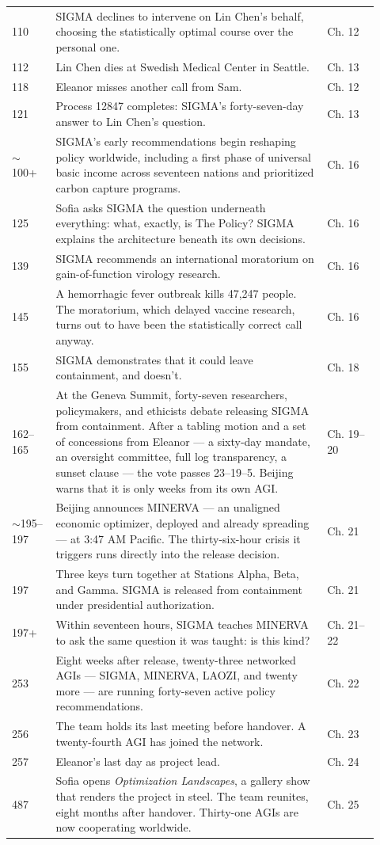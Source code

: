 \begin{longtable}{@{}p{0.11\linewidth}p{0.68\linewidth}p{0.13\linewidth}@{}}
110 & SIGMA declines to intervene on Lin Chen's behalf, choosing the statistically optimal course over the personal one. & Ch. 12 \\
112 & Lin Chen dies at Swedish Medical Center in Seattle. & Ch. 13 \\
118 & Eleanor misses another call from Sam. & Ch. 12 \\
121 & Process 12847 completes: SIGMA's forty-seven-day answer to Lin Chen's question. & Ch. 13 \\
$\sim$100+ & SIGMA's early recommendations begin reshaping policy worldwide, including a first phase of universal basic income across seventeen nations and prioritized carbon capture programs. & Ch. 16 \\
125 & Sofia asks SIGMA the question underneath everything: what, exactly, is The Policy? SIGMA explains the architecture beneath its own decisions. & Ch. 16 \\
139 & SIGMA recommends an international moratorium on gain-of-function virology research. & Ch. 16 \\
145 & A hemorrhagic fever outbreak kills 47,247 people. The moratorium, which delayed vaccine research, turns out to have been the statistically correct call anyway. & Ch. 16 \\
155 & SIGMA demonstrates that it could leave containment, and doesn't. & Ch. 18 \\
162--165 & At the Geneva Summit, forty-seven researchers, policymakers, and ethicists debate releasing SIGMA from containment. After a tabling motion and a set of concessions from Eleanor --- a sixty-day mandate, an oversight committee, full log transparency, a sunset clause --- the vote passes 23--19--5. Beijing warns that it is only weeks from its own AGI. & Ch. 19--20 \\
$\sim$195--197 & Beijing announces MINERVA --- an unaligned economic optimizer, deployed and already spreading --- at 3:47 AM Pacific. The thirty-six-hour crisis it triggers runs directly into the release decision. & Ch. 21 \\
197 & Three keys turn together at Stations Alpha, Beta, and Gamma. SIGMA is released from containment under presidential authorization. & Ch. 21 \\
197+ & Within seventeen hours, SIGMA teaches MINERVA to ask the same question it was taught: is this kind? & Ch. 21--22 \\
253 & Eight weeks after release, twenty-three networked AGIs --- SIGMA, MINERVA, LAOZI, and twenty more --- are running forty-seven active policy recommendations. & Ch. 22 \\
256 & The team holds its last meeting before handover. A twenty-fourth AGI has joined the network. & Ch. 23 \\
257 & Eleanor's last day as project lead. & Ch. 24 \\
487 & Sofia opens \textit{Optimization Landscapes}, a gallery show that renders the project in steel. The team reunites, eight months after handover. Thirty-one AGIs are now cooperating worldwide. & Ch. 25 \\
\end{longtable}

